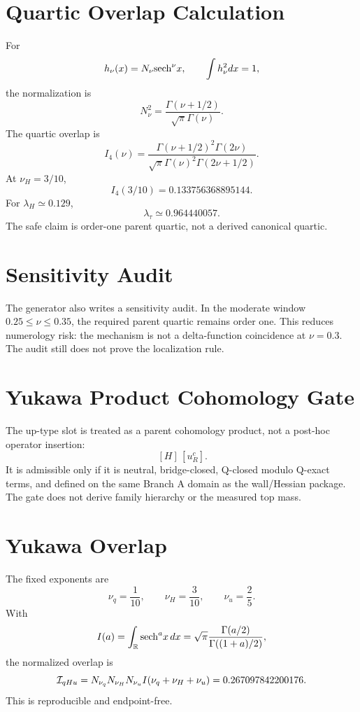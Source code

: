 \documentclass[11pt]{article}
\begin{document}
\section{Quartic Overlap Calculation}
For
\begin{equation}
h_\nu(x)=N_\nu{\rm sech}^{\nu}x,
\qquad
\int h_\nu^2dx=1,
\end{equation}
the normalization is
\begin{equation}
N_\nu^2=\frac{\Gamma(\nu+1/2)}{\sqrt\pi\Gamma(\nu)}.
\end{equation}
The quartic overlap is
\begin{equation}
I_4(\nu)
=
\frac{\Gamma(\nu+1/2)^2\Gamma(2\nu)}
{\sqrt\pi\Gamma(\nu)^2\Gamma(2\nu+1/2)}.
\end{equation}
At $\nu_H=3/10$,
\begin{equation}
I_4(3/10)=0.133756368895144.
\end{equation}
For $\lambda_H\simeq0.129$,
\begin{equation}
\lambda_\tau\simeq 0.964440057.
\end{equation}
The safe claim is order-one parent quartic, not a derived canonical quartic.

\section{Sensitivity Audit}
The generator also writes a sensitivity audit.  In the moderate window
$0.25\leq\nu\leq0.35$, the required parent quartic remains order one.  This
reduces numerology risk: the mechanism is not a delta-function coincidence at
$\nu=0.3$.  The audit still does not prove the localization rule.

\section{Yukawa Product Cohomology Gate}
The up-type slot is treated as a parent cohomology product, not a post-hoc
operator insertion:
\begin{equation}
[q_L]\,[H]\,[u_R^c].
\end{equation}
It is admissible only if it is neutral, bridge-closed, Q-closed modulo Q-exact
terms, and defined on the same Branch A domain as the wall/Hessian package.
The gate does not derive family hierarchy or the measured top mass.

\section{Yukawa Overlap}
The fixed exponents are
\begin{equation}
\nu_q=\frac1{10},
\qquad
\nu_H=\frac3{10},
\qquad
\nu_u=\frac25.
\end{equation}
With
\begin{equation}
I(a)=\int_{\mathbb R}{\rm sech}^a x\,dx
=\sqrt\pi\frac{\Gamma(a/2)}{\Gamma((1+a)/2)},
\end{equation}
the normalized overlap is
\begin{equation}
{\cal I}_{qHu}
=
N_{\nu_q}N_{\nu_H}N_{\nu_u}
I(\nu_q+\nu_H+\nu_u)
=
0.267097842200176.
\end{equation}
This is reproducible and endpoint-free.
\end{document}
